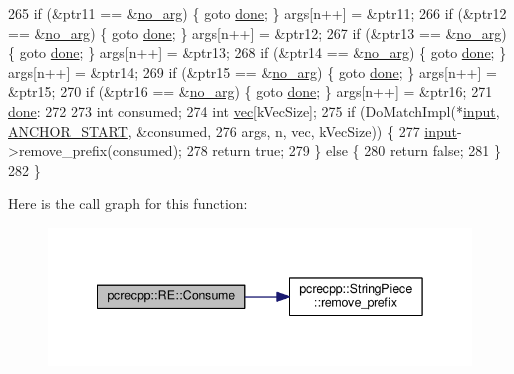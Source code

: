 \begin{DoxyCode}
265   \textcolor{keywordflow}{if} (&ptr11 == &\hyperlink{classpcrecpp_1_1RE_a596c7c964ad0e41415540e12ee73d302}{no\_arg}) \{ \textcolor{keywordflow}{goto} \hyperlink{README_8txt_aab36b2734b1c834ca42fc771a40b98ef}{done}; \} args[n++] = &ptr11;
266   \textcolor{keywordflow}{if} (&ptr12 == &\hyperlink{classpcrecpp_1_1RE_a596c7c964ad0e41415540e12ee73d302}{no\_arg}) \{ \textcolor{keywordflow}{goto} \hyperlink{README_8txt_aab36b2734b1c834ca42fc771a40b98ef}{done}; \} args[n++] = &ptr12;
267   \textcolor{keywordflow}{if} (&ptr13 == &\hyperlink{classpcrecpp_1_1RE_a596c7c964ad0e41415540e12ee73d302}{no\_arg}) \{ \textcolor{keywordflow}{goto} \hyperlink{README_8txt_aab36b2734b1c834ca42fc771a40b98ef}{done}; \} args[n++] = &ptr13;
268   \textcolor{keywordflow}{if} (&ptr14 == &\hyperlink{classpcrecpp_1_1RE_a596c7c964ad0e41415540e12ee73d302}{no\_arg}) \{ \textcolor{keywordflow}{goto} \hyperlink{README_8txt_aab36b2734b1c834ca42fc771a40b98ef}{done}; \} args[n++] = &ptr14;
269   \textcolor{keywordflow}{if} (&ptr15 == &\hyperlink{classpcrecpp_1_1RE_a596c7c964ad0e41415540e12ee73d302}{no\_arg}) \{ \textcolor{keywordflow}{goto} \hyperlink{README_8txt_aab36b2734b1c834ca42fc771a40b98ef}{done}; \} args[n++] = &ptr15;
270   \textcolor{keywordflow}{if} (&ptr16 == &\hyperlink{classpcrecpp_1_1RE_a596c7c964ad0e41415540e12ee73d302}{no\_arg}) \{ \textcolor{keywordflow}{goto} \hyperlink{README_8txt_aab36b2734b1c834ca42fc771a40b98ef}{done}; \} args[n++] = &ptr16;
271  \hyperlink{README_8txt_aab36b2734b1c834ca42fc771a40b98ef}{done}:
272 
273   \textcolor{keywordtype}{int} consumed;
274   \textcolor{keywordtype}{int} \hyperlink{group__apr__file__io_ga026ee9293cfdb03a3944adbd192f1ead}{vec}[kVecSize];
275   \textcolor{keywordflow}{if} (DoMatchImpl(*\hyperlink{group__APACHE__CORE__DAEMON_gaf801cc3fb2a90cf95d512d76fb498c3f}{input}, \hyperlink{classpcrecpp_1_1RE_aafe8a162d00ec7a7d6d2ba67652735efa59db4a3f1e5cb92ae648e57c71204757}{ANCHOR\_START}, &consumed,
276                   args, n, vec, kVecSize)) \{
277     \hyperlink{group__APACHE__CORE__DAEMON_gaf801cc3fb2a90cf95d512d76fb498c3f}{input}->remove\_prefix(consumed);
278     \textcolor{keywordflow}{return} \textcolor{keyword}{true};
279   \} \textcolor{keywordflow}{else} \{
280     \textcolor{keywordflow}{return} \textcolor{keyword}{false};
281   \}
282 \}
\end{DoxyCode}


Here is the call graph for this function\+:
\nopagebreak
\begin{figure}[H]
\begin{center}
\leavevmode
\includegraphics[width=342pt]{classpcrecpp_1_1RE_a6fb0045f77ca2996fd8ae44f80f4d49e_cgraph}
\end{center}
\end{figure}




